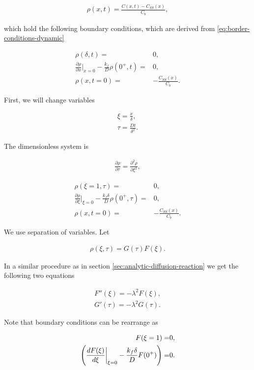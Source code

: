 \begin{align}
	\rho(x, t) = \frac{C(x,t) - C_{SS}(x)}{C_b},
\end{align}


which hold the following boundary conditions, which are derived from \ref{eq:border-conditions-dynamic}



\begin{align}
			\rho(\delta, t) =& 0,\\
		\frac{\partial \rho}{\partial x}\big|_{x=0} -\frac{k_f}{D}\rho(0^+,t) =& 0,\\
		\rho(x, t=0) =& -\frac{C_{SS}(x)}{C_b}.
\end{align}


First, we will change variables

\begin{align}
	\xi = \frac{x}{\delta},\\
	\tau = \frac{D t}{\delta^2}.
\end{align}

The dimensionless system is

\begin{align}
		\frac{\partial \rho}{\partial \tau} = \frac{\partial^2 \rho}{\partial \xi^2},
		\label{eq:dynamic-system}
	\end{align}

\begin{align}
			\rho(\xi = 1, \tau) =& 0,\\
		\frac{\partial \rho}{\partial \xi}\big|_{\xi=0} -\frac{k_f\delta}{D}\rho(0^+,\tau) =& 0,\\
		\rho(x, t=0) =& -\frac{C_{SS}(x)}{C_b}.
\end{align}


We use separation of variables. Let

\begin{align}
	\rho(\xi, \tau) =  G(\tau) F(\xi).
\end{align}

In a similar procedure as in section \ref{sec:analytic-diffusion-reaction} we get the following two equations

\begin{align}
	F''(\xi) = -\lambda^2 F(\xi), 
	\label{eq:F-equation}\\
	G'(\tau) = -\lambda^2 G(\tau).
	\label{eq:G-equation}
\end{align}

Note that boundary conditions can be rearrange as


\begin{align}
			F(\xi=1) =& 0,\\
		\left({\frac{d F(\xi)}{d \xi}\bigg|_{\xi=0} -\frac{k_f\delta}{D}F(0^+)}\right) =& 0.
\end{align}


